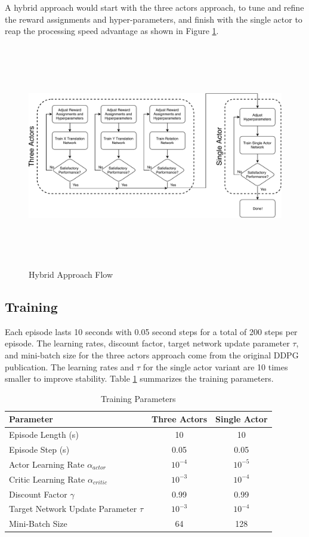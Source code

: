 A hybrid approach would start with the three actors approach, to tune and refine the reward assignments and hyper-parameters, and finish with the single actor to reap the processing speed advantage as shown in Figure \ref{fig:hybrid_approach_flow}.
\begin{figure}[H]
	\centering
	\includegraphics[width=6in, height=3.85in, keepaspectratio]{figures/hybrid_approach_flow.pdf}
	\caption{Hybrid Approach Flow} \label{fig:hybrid_approach_flow}
\end{figure}

\subsection{Training}
Each episode lasts 10 seconds with 0.05 second steps for a total of 200 steps per episode. The learning rates, discount factor, target network update parameter $\tau$, and mini-batch size for the three actors approach come from the original DDPG publication. The learning rates and $\tau$ for the single actor variant are 10 times smaller to improve stability. Table \ref{tab:training_params} summarizes the training parameters.
\begin{table}[h]
	\caption{Training Parameters}  \label{tab:training_params}
	\centering
	\begin{tabular}{l|c|c}
		\toprule
		Parameter & Three Actors & Single Actor \\ 
		\midrule
		Episode Length (s) & 10 & 10 \\
		Episode Step (s) & 0.05 & 0.05 \\
		Actor Learning Rate $\alpha_{actor}$ & $10^{-4}$ & $10^{-5}$ \\
		Critic Learning Rate $\alpha_{critic}$  & $10^{-3}$ & $10^{-4}$ \\
		Discount Factor $\gamma$ & 0.99 & 0.99 \\
		Target Network Update Parameter $\tau$ & $10^{-3}$ & $10^{-4}$ \\
		Mini-Batch Size & 64 & 128 \\
		\bottomrule
	\end{tabular} 
\end{table}

